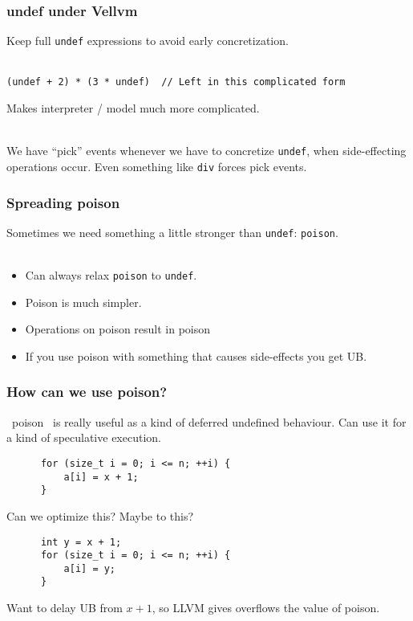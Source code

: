 \documentclass{beamer}
\begin{document}
\begin{frame}[fragile]
  \frametitle{undef under Vellvm}

  Keep full {\tt undef} expressions to avoid early concretization.\\~

\begin{lstlisting}
(undef + 2) * (3 * undef)  // Left in this complicated form
\end{lstlisting}

  Makes interpreter / model much more complicated. \\~

  We have ``pick'' events whenever we have to concretize {\tt undef},
  when side-effecting operations occur. Even something like {\tt div}
  forces pick events.

\end{frame}

\begin{frame}
  \frametitle{Spreading poison}

  Sometimes we need something a little stronger than {\tt undef}:
  {\tt poison}.\\~

  \begin{itemize}
  \item Can always relax {\tt poison} to {\tt undef}.
  \item Poison is much simpler.
  \item Operations on poison result in poison
  \item If you use poison with something that causes side-effects you
    get UB.
  \end{itemize}
\end{frame}

\begin{frame}[fragile]
  \frametitle{How can we use poison?}

  ~poison~ is really useful as a kind of deferred undefined
  behaviour. Can use it for a kind of speculative execution.

\begin{lstlisting}
      for (size_t i = 0; i <= n; ++i) {
          a[i] = x + 1;
      }
\end{lstlisting}

  Can we optimize this? \pause Maybe to this?

\begin{lstlisting}
      int y = x + 1;
      for (size_t i = 0; i <= n; ++i) {
          a[i] = y;
      }
\end{lstlisting}

  Want to delay UB from $x + 1$, so LLVM gives overflows the value of
  poison.
  
\end{frame}
\end{document}
